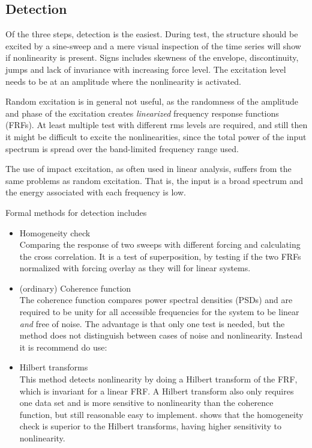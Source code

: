 

\subsection{Detection}

Of the three steps, detection is the easiest. During test, the structure should
be excited by a sine-sweep and a mere visual inspection of the time series will
show if nonlinearity is present. Signs includes skewness of the envelope,
discontinuity, jumps and lack of invariance with increasing force level. The
excitation level needs to be at an amplitude where the nonlinearity is
activated.

Random excitation is in general not useful, as the randomness of the amplitude
and phase of the excitation creates \textit{linearized} frequency response functions
(FRFs). At least multiple test with different rms levels are required, and still
then it might be difficult to excite the nonlinearities, since the total power
of the input spectrum is spread over the band-limited frequency range used.

The use of impact excitation, as often used in linear analysis, suffers from the
same problems as random excitation. That is, the input is a broad spectrum and
the energy associated with each frequency is low.


Formal methods for detection includes

\begin{itemize}
\item Homogeneity check \\
  Comparing the response of two sweeps with different forcing and calculating
  the cross correlation. It is a test of superposition, by testing if the two FRFs
  normalized with forcing overlay as they will for linear systems.
\item (ordinary) Coherence function \\
  The coherence function compares power spectral densities (PSDs) and are
  required to be unity for all accessible frequencies for the system to be
  linear \textit{and} free of noise. The advantage is that only one test is needed,
  but the method does not distinguish between cases of noise and
  nonlinearity. Instead it is recommend do use:
\item Hilbert transforms \\
  This method detects nonlinearity by doing a Hilbert transform of the FRF,
  which is invariant for a linear FRF.
  A Hilbert transform also only requires one data set and is more sensitive to
  nonlinearity than the coherence function, but still reasonable easy to
  implement. \textcite{kragh2010a} shows that the homogeneity check is superior to
  the Hilbert transforms, having higher sensitivity to nonlinearity.
\end{itemize}

